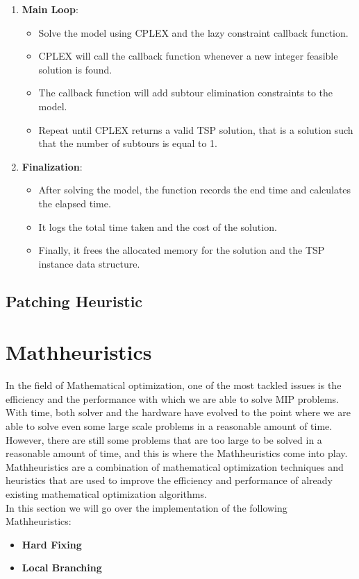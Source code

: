 \documentclass{article}
\begin{document}
\begin{enumerate}
\begin{lstlisting}[language=C]
	\end{lstlisting}
	\item \textbf{Main Loop}:
	\begin{itemize}
		\item Solve the model using CPLEX and the lazy constraint callback function.
		\item CPLEX will call the callback function whenever a new integer feasible solution is found.
		\item The callback function will add subtour elimination constraints to the model.
		\item Repeat until CPLEX returns a valid TSP solution, that is a solution such that the number of subtours is equal to 1.
	\end{itemize}
	\item \textbf{Finalization}:
	\begin{itemize}
		\item After solving the model, the function records the end time and calculates the elapsed time.
		\item It logs the total time taken and the cost of the solution.
		\item Finally, it frees the allocated memory for the solution and the TSP instance data structure.
	\end{itemize}
\end{enumerate}

\subsection{Patching Heuristic}

\newpage

\section{Mathheuristics}
In the field of Mathematical optimization, one of the most tackled issues is the efficiency and the performance with which
we are able to solve MIP problems. With time, both solver and the hardware have evolved to the point where we are able to solve even some large scale problems 
in a reasonable amount of time. However, there are still some problems that are too large to be solved in a reasonable amount of time, and this is where the Mathheuristics 
come into play. Mathheuristics are a combination of mathematical optimization techniques and heuristics that are used to improve the efficiency and performance of 
already existing mathematical optimization algorithms.\cite{Fischetti2003LocalBranching}\cite{Fischetti2016Matheuristics} \\
In this section we will go over the implementation of the following Mathheuristics:
\begin{itemize}
	\item \textbf{Hard Fixing}
	\item \textbf{Local Branching}
\end{itemize}
\end{document}

